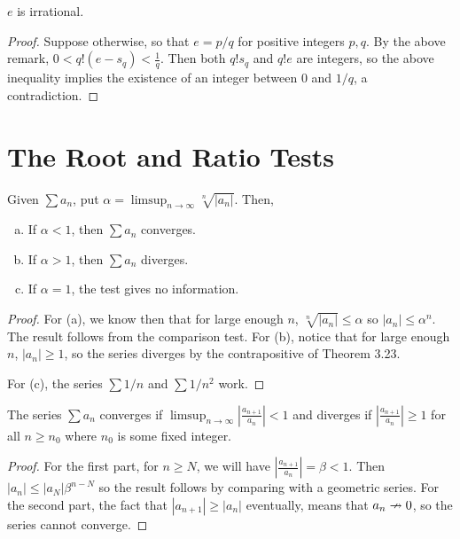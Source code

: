 \begin{theorem} %
$e$ is irrational.

\begin{proof}
Suppose otherwise, so that $e = p/q$ for positive integers $p, q$. By the above remark, $0 < q!(e - s_q) < \frac{1}{q}$. Then both $q!s_q$ and $q!e$ are integers, so the above inequality implies the existence of an integer between 0 and $1/q$, a contradiction.
\end{proof}
\end{theorem}

\section{The Root and Ratio Tests}

\begin{theorem} %
Given $\sum a_n$, put $\alpha = \limsup_{n \to \infty} \sqrt[n]{|a_n|}$. Then,
\begin{enumerate}[(a)]
\item If $\alpha < 1$, then $\sum a_n$ converges.
\item If $\alpha > 1$, then $\sum a_n$ diverges.
\item If $\alpha = 1$, the test gives no information.
\end{enumerate}

\begin{proof}
For (a), we know then that for large enough $n$, $\sqrt[n]{|a_n|} \le \alpha$ so $|a_n| \le \alpha^n$. The result follows from the comparison test. For (b), notice that for large enough $n$, $|a_n| \ge 1$, so the series diverges by the contrapositive of Theorem 3.23.

For (c), the series $\sum 1/n$ and $\sum 1/n^2$ work.
\end{proof}
\end{theorem}

\begin{theorem} %
The series $\sum a_n$ converges if $\limsup_{n \to \infty} \left| \frac{a_{n+1}}{a_n}\right| < 1$ and diverges if $\left|\frac{a_{n+1}}{a_n}\right| \ge 1$ for all $n \ge n_0$ where $n_0$ is some fixed integer.

\begin{proof}
For the first part, for $n \ge N$, we will have $\left|\frac{a_{n+1}}{a_n}\right| = \beta < 1$. Then $|a_n| \le |a_N| \beta^{n-N}$ so the result follows by comparing with a geometric series. For the second part, the fact that $|a_{n+1}| \ge |a_n|$ eventually, means that $a_n \nrightarrow 0$, so the series cannot converge.
\end{proof}
\end{theorem}

